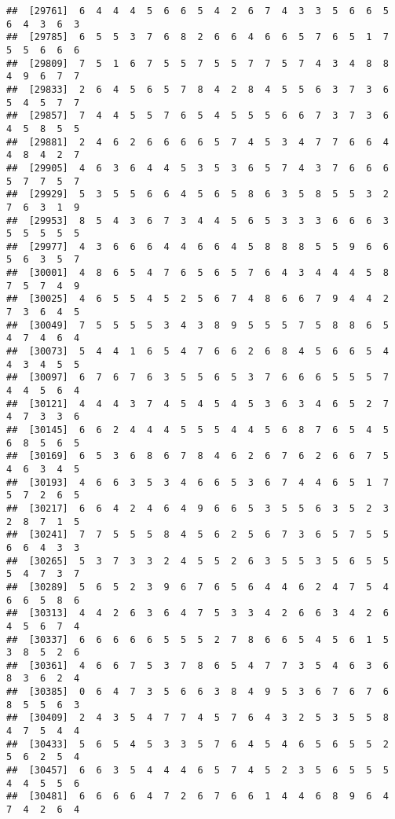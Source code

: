 \documentclass[
]{book}
\begin{document}
\begin{verbatim}
##  [29761]  6  4  4  4  5  6  6  5  4  2  6  7  4  3  3  5  6  6  5  6  4  3  6  3
##  [29785]  6  5  5  3  7  6  8  2  6  6  4  6  6  5  7  6  5  1  7  5  5  6  6  6
##  [29809]  7  5  1  6  7  5  5  7  5  5  7  7  5  7  4  3  4  8  8  4  9  6  7  7
##  [29833]  2  6  4  5  6  5  7  8  4  2  8  4  5  5  6  3  7  3  6  5  4  5  7  7
##  [29857]  7  4  4  5  5  7  6  5  4  5  5  5  6  6  7  3  7  3  6  4  5  8  5  5
##  [29881]  2  4  6  2  6  6  6  6  5  7  4  5  3  4  7  7  6  6  4  4  8  4  2  7
##  [29905]  4  6  3  6  4  4  5  3  5  3  6  5  7  4  3  7  6  6  6  5  7  7  5  7
##  [29929]  5  3  5  5  6  6  4  5  6  5  8  6  3  5  8  5  5  3  2  7  6  3  1  9
##  [29953]  8  5  4  3  6  7  3  4  4  5  6  5  3  3  3  6  6  6  3  5  5  5  5  5
##  [29977]  4  3  6  6  6  4  4  6  6  4  5  8  8  8  5  5  9  6  6  5  6  3  5  7
##  [30001]  4  8  6  5  4  7  6  5  6  5  7  6  4  3  4  4  4  5  8  7  5  7  4  9
##  [30025]  4  6  5  5  4  5  2  5  6  7  4  8  6  6  7  9  4  4  2  7  3  6  4  5
##  [30049]  7  5  5  5  5  3  4  3  8  9  5  5  5  7  5  8  8  6  5  4  7  4  6  4
##  [30073]  5  4  4  1  6  5  4  7  6  6  2  6  8  4  5  6  6  5  4  4  3  4  5  5
##  [30097]  6  7  6  7  6  3  5  5  6  5  3  7  6  6  6  5  5  5  7  4  4  5  6  4
##  [30121]  4  4  4  3  7  4  5  4  5  4  5  3  6  3  4  6  5  2  7  4  7  3  3  6
##  [30145]  6  6  2  4  4  4  5  5  5  4  4  5  6  8  7  6  5  4  5  6  8  5  6  5
##  [30169]  6  5  3  6  8  6  7  8  4  6  2  6  7  6  2  6  6  7  5  4  6  3  4  5
##  [30193]  4  6  6  3  5  3  4  6  6  5  3  6  7  4  4  6  5  1  7  5  7  2  6  5
##  [30217]  6  6  4  2  4  6  4  9  6  6  5  3  5  5  6  3  5  2  3  2  8  7  1  5
##  [30241]  7  7  5  5  5  8  4  5  6  2  5  6  7  3  6  5  7  5  5  6  6  4  3  3
##  [30265]  5  3  7  3  3  2  4  5  5  2  6  3  5  5  3  5  6  5  5  5  4  7  3  7
##  [30289]  5  6  5  2  3  9  6  7  6  5  6  4  4  6  2  4  7  5  4  6  6  5  8  6
##  [30313]  4  4  2  6  3  6  4  7  5  3  3  4  2  6  6  3  4  2  6  4  5  6  7  4
##  [30337]  6  6  6  6  6  5  5  5  2  7  8  6  6  5  4  5  6  1  5  3  8  5  2  6
##  [30361]  4  6  6  7  5  3  7  8  6  5  4  7  7  3  5  4  6  3  6  8  3  6  2  4
##  [30385]  0  6  4  7  3  5  6  6  3  8  4  9  5  3  6  7  6  7  6  8  5  5  6  3
##  [30409]  2  4  3  5  4  7  7  4  5  7  6  4  3  2  5  3  5  5  8  4  7  5  4  4
##  [30433]  5  6  5  4  5  3  3  5  7  6  4  5  4  6  5  6  5  5  2  5  6  2  5  4
##  [30457]  6  6  3  5  4  4  4  6  5  7  4  5  2  3  5  6  5  5  5  4  4  5  5  6
##  [30481]  6  6  6  6  4  7  2  6  7  6  6  1  4  4  6  8  9  6  4  7  4  2  6  4

\end{verbatim}
\end{document}
